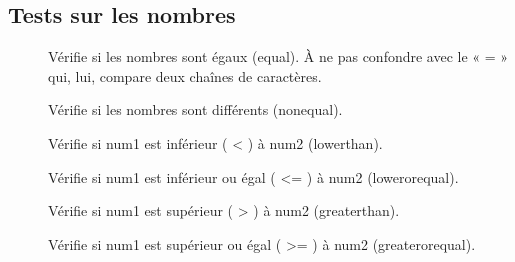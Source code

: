 \documentclass[letterpaper,10pt,french]{sphinxmanual}
\begin{document}
\subsection{Tests sur les nombres}
\label{\detokenize{21-scripts-shell:tests-sur-les-nombres}}\begin{description}
\item[{}] \leavevmode
Vérifie si les nombres sont égaux (equal). À ne pas confondre avec le « = » qui, lui, compare deux chaînes de caractères.

\item[{}] \leavevmode
Vérifie si les nombres sont différents (nonequal).

\end{description}

\begin{description}
\item[{}] \leavevmode
Vérifie si num1 est inférieur ( \textless{} ) à num2 (lowerthan).

\item[{}] \leavevmode
Vérifie si num1 est inférieur ou égal ( \textless{}= ) à num2 (lowerorequal).

\item[{}] \leavevmode
Vérifie si num1 est supérieur ( \textgreater{} ) à num2 (greaterthan).

\item[{}] \leavevmode
Vérifie si num1 est supérieur ou égal ( \textgreater{}= ) à num2 (greaterorequal).

\end{description}
\end{document}
